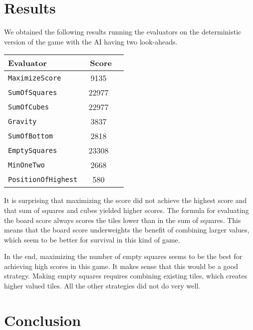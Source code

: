 \documentclass[11pt]{article}
\begin{document}
\section{Results}

We obtained the following results running the evaluators on the deterministic version of the game with the AI having two look-aheads.

\begin{tabular}{l c c}
\hline\hline %
Evaluator & \ Score
\\ [0.5ex] 
\hline %
 
\texttt{MaximizeScore} & 9135 \\

\texttt{SumOfSquares} &  22977 \\

\texttt{SumOfCubes} &  22977  \\

\texttt{Gravity} & 3837   \\

\texttt{SumOfBottom} & 2818  \\

\texttt{EmptySquares} & 23308  \\

\texttt{MinOneTwo} & 2668\\

\texttt{PositionOfHighest} & 580  \\
 
\hline %
\end{tabular}


It is surprising that maximizing the score did not achieve the highest score and that sum of squares and cubes yielded higher scores. The formula for evaluating the board score always scores the tiles lower than in the sum of squares. This means that the board score underweights the benefit of combining larger values, which seem to be better for survival in this kind of game. 

In the end, maximizing the number of empty squares seems to be the best for achieving high scores in this game. It makes sense that this would be a good strategy. Making empty squares requires combining existing tiles, which creates higher valued tiles. All the other strategies did not do very well. 

\section{Conclusion}
\end{document}
